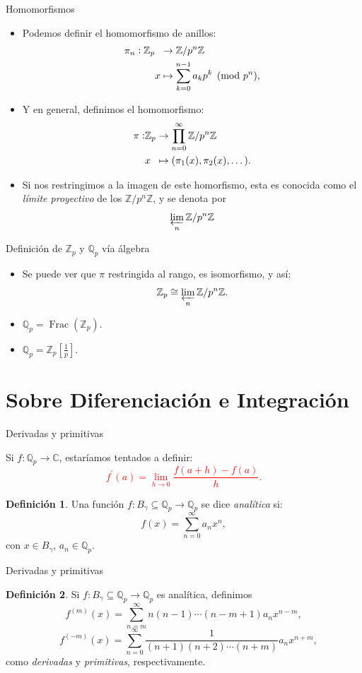 \documentclass{beamer}
\newcommand{\bb}[1]{\mathbb{#1}}
\theoremstyle{definition}
\numberwithin{equation}{section}
\newcommand{\marine}[1]{\textcolor{defColor}{#1}}
\newtheorem{df}{\marine{Definición}}
\newcommand{\tit}[1]{\textit{#1}}
\newcommand{\red}[1]{\textcolor{red}{#1}}
\newcommand{\Z}{\mathbb{Z}}
\newcommand{\C}{\mathbb{C}}
\newcommand{\Qp}{\mathbb{Q}_p}
\newcommand{\Zp}{\mathbb{Z}_p}
\begin{document}
\begin{frame}{Homomorfismos}
	\begin{itemize}[<+- | alert@+>]
		\item Podemos definir el homomorfismo de anillos: \begin{align*}
		\pi_n: \Zp &\hspace{2mm}\rightarrow \Z/p^n\Z \\
		& x \mapsto  \sum_{k=0}^{n-1}a_{k}p^k\pmod{p^n},
		\end{align*}
		\item Y en general, definimos el homomorfismo:	\begin{align*}
		\pi:& \Zp \rightarrow \prod_{n=0}^{\infty}\Z/p^n\Z \\
		& x \hspace{2mm}\mapsto  (\pi_1 (x),\pi_2 (x),\dots) .
		\end{align*}
		\item Si nos restringimos a la imagen de este homorfismo, esta es conocida como el \tit{límite proyectivo} de los  $\Z/p^n\Z$, y se denota por $$\varprojlim_n \Z/p^n\Z$$ 
\end{itemize}
\end{frame}


\begin{frame}{Definición de $\Zp$ y $\Qp$ vía álgebra}
	\begin{itemize}[<+- | alert@+>]
		\item Se puede ver que $\pi$ restringida al rango, es isomorfismo, y así:
		$$\Zp\cong\varprojlim_n \Z/p^n\Z.$$
		\item $\bb{Q}_p=\operatorname{Frac} (\Zp).$
		\item $\bb{Q}_p=\bb{Z}_p[\frac{1}{p}]$.
	\end{itemize}
\end{frame}

\section{Sobre Diferenciación e Integración}

\begin{frame}{Derivadas y primitivas}
	
		Si $f\colon\Qp\to\C$, estaríamos tentados a definir: \red{$$f^{\prime} (a)=\lim\limits_{h\to 0}\frac{f (a+h)-f (a)}{h}.$$}
	\begin{df}
		Una función $f\colon B_\gamma\subseteq\Qp\to\Qp$ se dice \tit{analítica} si:
		$$f (x)=\sum_{n=0}^{\infty}a_nx^n,$$
		con $x\in B_\gamma$, $a_n\in\Qp$. 
	\end{df}
	
\end{frame}
\begin{frame}{Derivadas y primitivas}
	\begin{df} Si $f\colon B_\gamma\subseteq\Qp\to\Qp$ es analítica, definimos
		\[
		f^{ (m)} (x)=\sum_{n=m}^{\infty} n (n-1) \cdots (n-m+1) a_{n} x^{n-m},
		\]
		\[
		\quad f^{ (-m)} (x)=\sum_{n=0}^{\infty} \frac{1}{ (n+1) (n+2) \cdots (n+m)} a_{n} x^{n+m},
		\] 
		como \textit{derivadas} y \textit{primitivas}, respectivamente.
	\end{df}
\end{frame}
\end{document}
